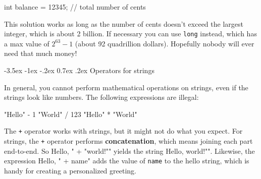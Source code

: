 \documentclass[12pt]{book}
\makeatletter
\theoremstyle{exercise}
\newcommand{\java}[1]{\verb"#1"}
\renewcommand{\section}{\@startsection{section}{1}{\z@}%
    {-3.5ex \@plus -1ex \@minus -.2ex}%
    {0.7ex \@plus.2ex}%
    {\normalfont\Large\bfseries}}
\renewcommand\subsection{\@startsection{subsection}{2}{\z@}%
    {-3.25ex\@plus -1ex \@minus -.2ex}%
    {0.3ex \@plus .2ex}%
    {\normalfont\large\bfseries}}
\newcommand{\java}[1]{\lstinline{#1}} %
\makeatother
\begin{document}
\begin{code}
    int balance = 12345;      // total number of cents
\end{code}


This solution works as long as the number of cents doesn't exceed the largest integer, which is about 2 billion.
If necessary you can use \java{long} instead, which has a max value of $2^{63}-1$ (about 92 quadrillion dollars).
Hopefully nobody will ever need that much money!


\section{Operators for strings}


In general, you cannot perform mathematical operations on strings, even if the strings look like numbers.
The following expressions are illegal:

\begin{code}
    "Hello" - 1     "World" / 123     "Hello" * "World"
\end{code}



The \java{+} operator works with strings, but it might not do what you expect.
For strings, the \java{+} operator performs {\bf concatenation}, which means joining each part end-to-end.
So \java{"Hello, " + "world!"} yields the string \java{"Hello, world!"}.
Likewise, the expression \java{"Hello, " + name} adds the value of \java{name} to the hello string, which is handy for creating a personalized greeting.



\end{document}
